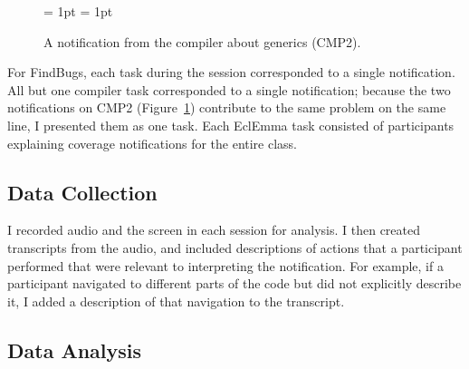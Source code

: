 \begin{figure} 
\subfigcapskip = 1pt
\centering
{}
\subfigcapskip = 1pt

\caption{A notification from the compiler about generics (CMP2).}
\label{fig:CMP2} 
\end{figure}

For FindBugs, each task during the session corresponded to a single
notification.
All but one compiler task corresponded to a single notification;
because the two notifications on CMP2 (Figure~\ref{fig:CMP2}) contribute to the same problem on the same line, I presented them as one task. 
Each EclEmma task consisted of participants explaining coverage notifications for the entire class. 

\subsection{Data Collection}

I recorded audio and the screen in each session for analysis.
I then created transcripts from the audio, 
and included descriptions of actions that a participant performed 
that were relevant to interpreting the notification. 
For example, if a participant navigated to different parts of the code 
but did not explicitly describe it, 
I added a description of that navigation to the transcript.

\subsection{Data Analysis}

